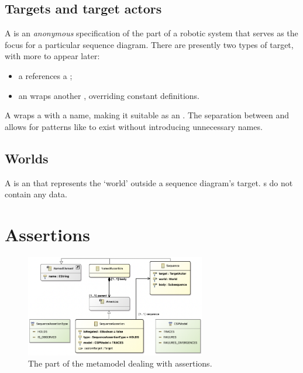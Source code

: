 \subsection{Targets and target actors}\label{ssec:metamodel-actors-target}

A \mtarget{} is an \emph{anonymous} specification of the part of a robotic
system that serves as the focus for a particular sequence diagram.  There are
presently two types of target, with more to appear later:

\begin{itemize}
\item
	a \mrcmoduletarget{} references a \mrcmodule;
\item
	an \moverridetarget{} wraps another \mtarget, overriding constant
	definitions.
\end{itemize}

A \mtargetactor{} wraps a \mtarget{} with a name, making it suitable as an
\mactor.  The separation between \mtarget{} and \mtargetactor{} allows for
patterns like \moverridetarget{} to exist without introducing unnecessary names.

\subsection{Worlds}\label{ssec:metamodel-actors-world}

A \mworld{} is an \mactor{} that represents the `world' outside a sequence
diagram's target.  \mworld s do not contain any data.

\section{Assertions}\label{sec:metamodel-assertions}

\begin{figure}
	\centering
	\includegraphics[width=0.7\textwidth]{diagrams/assertions.png}
	\caption{The part of the \langname{} metamodel dealing with assertions.}
	\label{fig:metamodel-assertions}
\end{figure}

